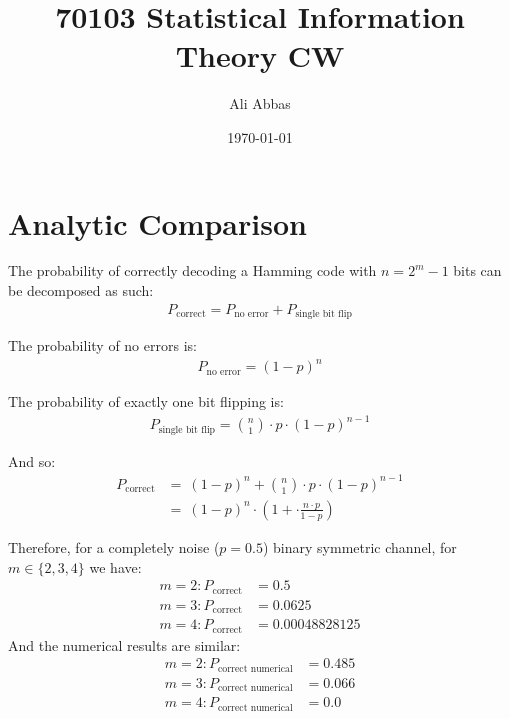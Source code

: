 \documentclass[fleqn]{article}
\date{\today}
\author{Ali Abbas}
\title{70103 Statistical Information Theory CW}
\begin{document}
  \maketitle
  \section{Analytic Comparison}
  The probability of correctly decoding a Hamming code with $n = 2^m - 1$ bits can be decomposed as such:
  \begin{align*}
    P_{\text{correct}} = P_{\text{no error}} + P_{\text{single bit flip}}
  \end{align*}
  
  The probability of no errors is:
  \begin{align*}
    P_{\text{no error}} = (1 - p)^n
  \end{align*}
  
  The probability of exactly one bit flipping is:
  \begin{align*}
    P_{\text{single bit flip}} = \binom{n}{1} \cdot p \cdot (1 - p)^{n-1}
  \end{align*}
  
  And so:
  \begin{align*}
    P_{\text{correct}} &=\ (1 - p)^n + \binom{n}{1} \cdot p \cdot (1 - p)^{n-1} \\
     &=\ (1 - p)^n \cdot \left(1 + \cdot \frac{n \cdot p}{1 - p}\right)
  \end{align*}

  Therefore, for a completely noise ($p = 0.5$) binary symmetric channel, for $m \in \{2, 3, 4 \}$ we have:
  \begin{align*}
    m = 2: P_{\text{correct}} &= 0.5 \\
    m = 3: P_{\text{correct}} &= 0.0625 \\
    m = 4: P_{\text{correct}} &= 0.00048828125
  \end{align*}
  And the numerical results are similar:
  \begin{align*}
    m = 2: P_{\text{correct numerical}} &= 0.485 \\
    m = 3: P_{\text{correct numerical}} &= 0.066 \\
    m = 4: P_{\text{correct numerical}} &= 0.0
  \end{align*}

  \pagebreak
\end{document}
